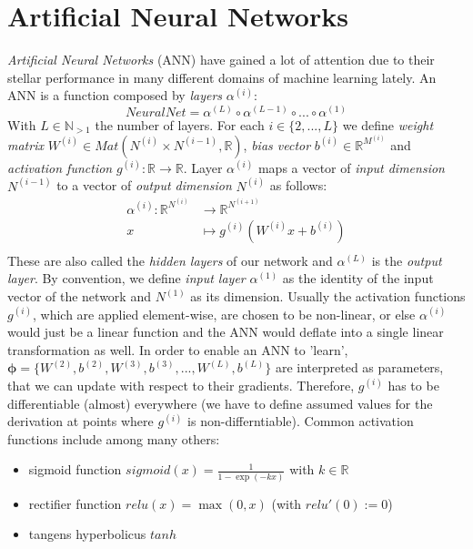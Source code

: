 \documentclass[12pt]{report}
\theoremstyle{definition}
\begin{document}
\section{Artificial Neural Networks}
\emph{Artificial Neural Networks} (ANN) have gained a lot of attention due to their stellar performance in many different domains of machine learning lately. An ANN is a function composed by \emph{layers} $\alpha^{(i)}$:
\begin{equation}
NeuralNet = \alpha^{(L)} \circ \alpha^{(L-1)} \circ ... \circ \alpha^{(1)}
\end{equation}
With $L \in \mathbb{N}_{>1}$ the number of layers. For each $i \in \{2, ..., L\} $ we define \emph{weight matrix} $W^{(i)} \in Mat(N^{(i)} \times N^{(i-1)}, \mathbb{R})$, \emph{bias vector} $b^{(i)} \in \mathbb{R}^{M^{(i)}}$ and \emph{activation function} $g^{(i)}: \mathbb{R} \rightarrow \mathbb{R}$. Layer $\alpha^{(i)}$ maps a vector of \emph{input dimension} $N^{(i-1)}$ to a vector of \emph{output dimension} $N^{(i)}$ as follows:
\begin{equation}
\begin{split}
\alpha^{(i)}: \mathbb{R}^{N^{(i)}} & \rightarrow \mathbb{R}^{N^{(i+1)}} \\
x & \mapsto g^{(i)}(W^{(i)}x+b^{(i)})\\
\end{split}
\end{equation}
These are also called the \emph{hidden layers} of our network and $\alpha^{(L)}$ is the \emph{output layer}. By convention, we define \emph{input layer} $\alpha^{(1)}$ as the identity of the input vector of the network and $N^{(1)}$ as its dimension.
Usually the activation functions $g^{(i)}$, which are applied element-wise, are chosen to be non-linear, or else $\alpha^{(i)}$ would just be a linear function and the ANN would deflate into a single linear transformation as well.
In order to enable an ANN to 'learn', $\pmb{\phi} = \{W^{(2)},  b^{(2)}, W^{(3)},  b^{(3)}, ..., W^{(L)},  b^{(L)}\}$ are interpreted as parameters, that we can update with respect to their gradients. Therefore, $g^{(i)}$ has to be differentiable (almost) everywhere (we have to define assumed values for the derivation at points where $g^{(i)}$ is non-differntiable). Common activation functions include among many others:
\begin{itemize}
\item sigmoid function $sigmoid(x) = \frac{1}{1 - \exp(-kx)}$ with $k \in \mathbb{R}$
\item rectifier function $relu(x) = \max(0, x)$ (with $relu'(0) := 0$)
\item tangens hyperbolicus $tanh$
\end{itemize}
\end{document}
